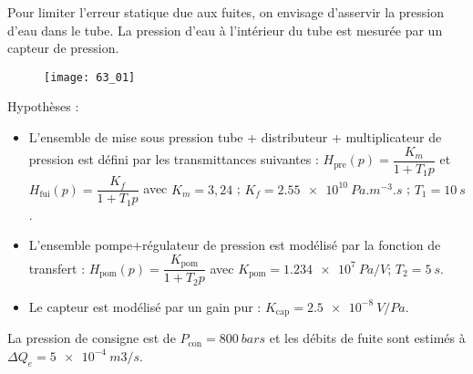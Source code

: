 \normaltrue \difficilefalse \tdifficilefalse
\correctiontrue

\setcounter{question}{0}%

\ifcorrection
\else
{}
\fi

\ifprof
\else 

Pour limiter l’erreur statique due aux fuites, on envisage d’asservir la pression d’eau dans le tube. 
La pression d’eau à l’intérieur du tube est mesurée par un capteur de pression. 

\begin{figure}[!h]
\texttt{[image: 63\_01]}
\end{figure}

 
 Hypothèses :
\begin{itemize}
\item L’ensemble de mise sous pression {tube + distributeur + multiplicateur de pression} est défini par les transmittances suivantes : $H_{\text{pre}} (p)=\dfrac{K_m}{1+T_1 p}$	et	$H_{\text{fui}} (p)=\dfrac{K_f}{1+T_1 p}$ avec 	$K_m = 3,24$ ; 	$K_f = \SI{2,55e10}{Pa.m^{-3}.s}$ ; 	$T_1  = \SI{10}{s}$.
\item L’ensemble {pompe+régulateur de pression} est modélisé par la fonction de transfert :
$H_{\text{pom}} (p)=\dfrac{K_{\text{pom}}}{1+T_2 p}$  avec 	$K_{\text{pom}} = \SI{1,234e7}{Pa/V}$; 	$T_2 = \SI{5}{s}$.
\item Le capteur est modélisé par un gain pur :	$K_{\text{cap}} = \SI{2,5e-8}{V/Pa}$.
\end{itemize}
La pression de consigne est de $P_{\text{con}} = \SI{800}{bars}$ et les débits de fuite sont estimés à $\Delta Q_e = \SI{5e-4}{m3/s}$.

